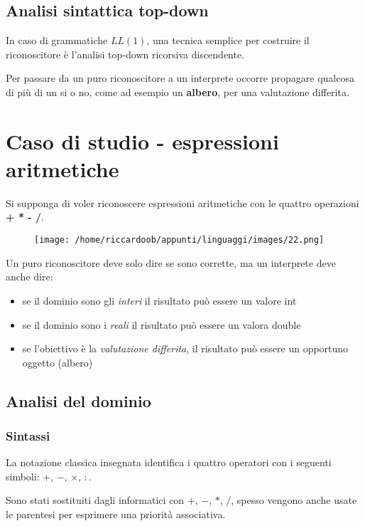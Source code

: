 \subsection{Analisi sintattica top-down}
In caso di grammatiche $LL(1)$, una tecnica semplice per costruire il riconoscitore è l'analisi top-down ricorsiva discendente.

Per passare da un puro riconoscitore a un interprete occorre propagare qualcosa di più di un si o no, come ad esempio un \textbf{albero}, per una valutazione differita.

\section{Caso di studio - espressioni aritmetiche}
Si supponga di voler riconoscere espressioni aritmetiche con le quattro operazioni \textbf{+ * - /}.

\begin{figure}[H]
    \centering
    \texttt{[image: /home/riccardoob/appunti/linguaggi/images/22.png]}
\end{figure}

Un puro riconoscitore deve solo dire se sono corrette, ma un interprete deve anche dire:
\begin{itemize}
    \item se il dominio sono gli \textit{interi} il risultato può essere un valore int
    \item se il dominio sono i \textit{reali} il risultato può essere un valora double
    \item se l'obiettivo è la \textit{valutazione differita}, il risultato può essere un opportuno oggetto (albero)
\end{itemize}

\subsection{Analisi del dominio}

\subsubsection{Sintassi}
La notazione classica insegnata identifica i quattro operatori con i seguenti simboli: $+$, $-$, $\times$, $:$.

Sono stati sostituiti dagli informatici con $+$, $-$, $*$, $/$, spesso vengono anche usate le parentesi per esprimere una priorità associativa.

